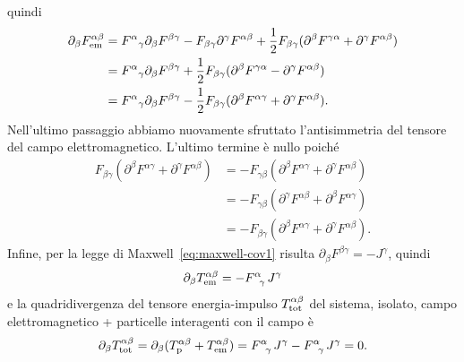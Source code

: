 quindi
\begin{equation}
  \begin{split}
    \partial_{\beta}F_{\textup{em}}^{\alpha\beta} &=
    \tensor{F}{^{\alpha}}_{\gamma}\partial_{\beta}F^{\beta\gamma}
    -F_{\beta\gamma} \partial^{\gamma} F^{\alpha\beta} +
    \frac{1}{2}F_{\beta\gamma}(\partial^{\beta}F^{\gamma\alpha}
    + \partial^{\gamma}F^{\alpha\beta}) \\
    &= \tensor{F}{^{\alpha}}_{\gamma}\partial_{\beta}F^{\beta\gamma} +
    \frac{1}{2}F_{\beta\gamma}(\partial^{\beta}F^{\gamma\alpha}
    - \partial^{\gamma}F^{\alpha\beta}) \\
    &= \tensor{F}{^{\alpha}}_{\gamma}\partial_{\beta}F^{\beta\gamma} -
    \frac{1}{2}F_{\beta\gamma}(\partial^{\beta}F^{\alpha\gamma}
    + \partial^{\gamma}F^{\alpha\beta}).
  \end{split}
\end{equation}
Nell'ultimo passaggio abbiamo nuovamente sfruttato l'antisimmetria del tensore
del campo elettromagnetico.  L'ultimo termine è nullo poiché
\begin{equation}
  \begin{split}
    F_{\beta\gamma}(\partial^{\beta}F^{\alpha\gamma}
    + \partial^{\gamma}F^{\alpha\beta}) &=
    -F_{\gamma\beta}(\partial^{\beta}F^{\alpha\gamma}
    + \partial^{\gamma}F^{\alpha\beta}) \\
    &= -F_{\gamma\beta}(\partial^{\gamma}F^{\alpha\beta}
    + \partial^{\beta}F^{\alpha\gamma}) \\
    &= -F_{\beta\gamma}(\partial^{\beta}F^{\alpha\gamma}
    + \partial^{\gamma}F^{\alpha\beta}).
  \end{split}
\end{equation}
Infine, per la legge di Maxwell~\eqref{eq:maxwell-cov1} risulta
$\partial_{\beta}F^{\beta\gamma} = -J^{\gamma}$, quindi
\begin{equation}
  \partial_{\beta}T_{\textup{em}}^{\alpha\beta} =
  -\tensor{F}{^{\alpha}_{\gamma}}J^{\gamma}
\end{equation}
e la quadridivergenza del tensore energia-impulso
$T_{\textup{tot}}^{\alpha\beta}$ del sistema, isolato, campo elettromagnetico +
particelle interagenti con il campo è
\begin{equation}
  \partial_{\beta}T_{\textup{tot}}^{\alpha\beta}
  = \partial_{\beta}(T_{\textup{p}}^{\alpha\beta} +
  T_{\textup{em}}^{\alpha\beta}) = \tensor{F}{^{\alpha}_{\gamma}}J^{\gamma} -
  \tensor{F}{^{\alpha}_{\gamma}}J^{\gamma} = 0.
\end{equation}

